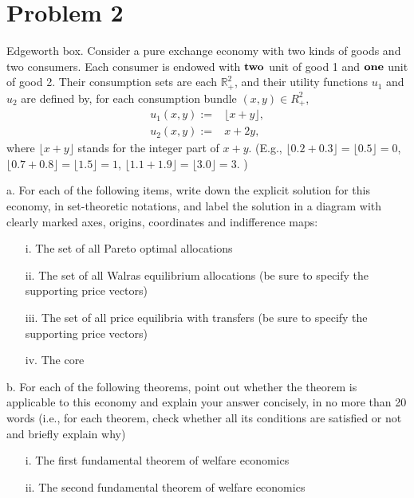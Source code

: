 \documentclass[12pt,notitlepage]{article}%
\numberwithin{equation}{section}
\begin{document}
	
	

\section{Problem 2}
Edgeworth box. Consider a pure exchange economy with two kinds of goods and two consumers. Each consumer is endowed with $\bf two$ unit of good 1 and $\bf one$ unit of good 2. Their consumption sets are each $\mathbb R_{+}^2$, and their utility functions $u_1$ and $u_2$ are defined by, for each consumption bundle $(x,y)\in R_{+}^2$,
\begin{equation}
\begin{split}
u_1(x,y):=&\lfloor  x+y\rfloor,\\
u_2(x,y):=&x+2y,
\end{split}
\end{equation}
where $\lfloor  x+y\rfloor$ stands for the integer part of $x+y$. (E.g., $\lfloor  0.2+0.3\rfloor=\lfloor  0.5\rfloor=0$, $\lfloor  0.7+0.8\rfloor=\lfloor  1.5\rfloor=1$, $\lfloor  1.1+1.9\rfloor=\lfloor  3.0\rfloor=3$. ) 

	a. For each of the following items, write down the explicit solution for this economy, in
set-theoretic notations, and label the solution in a diagram with clearly marked axes,
origins, coordinates and indifference maps:
\begin{itemize}
	\item[i.] The set of all Pareto optimal allocations
	\item[ii.] The set of all Walras equilibrium allocations (be sure to specify the supporting price vectors)
	\item[iii.] The set of all price equilibria with transfers (be sure to specify the supporting
	price vectors)
	\item[iv.] The core
\end{itemize}


b. For each of the following theorems, point out whether the theorem is applicable to this
economy and explain your answer concisely, in no more than 20 words (i.e., for each
theorem, check whether all its conditions are satisfied or not and briefly explain why)
\begin{itemize}
	\item[i.] The first fundamental theorem of welfare economics
	\item[ii.] The second fundamental theorem of welfare economics
\end{itemize}
\end{document}
